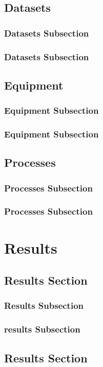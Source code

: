 \documentclass[oneside,14pt]{extarticle}
\begin{document}
		\subsection{Datasets}
			\subsubsection{Datasets Subsection}
			\subsubsection{Datasets Subsection}
		\subsection{Equipment}
			\subsubsection{Equipment Subsection}
			\subsubsection{Equipment Subsection}
		\subsection{Processes}
			\subsubsection{Processes Subsection}
			\subsubsection{Processes Subsection}
	\section{Results} 
		\subsection{Results Section}
			\subsubsection{Results Subsection}
			\subsubsection{results Subsection}
		\subsection{Results Section}
\end{document}
